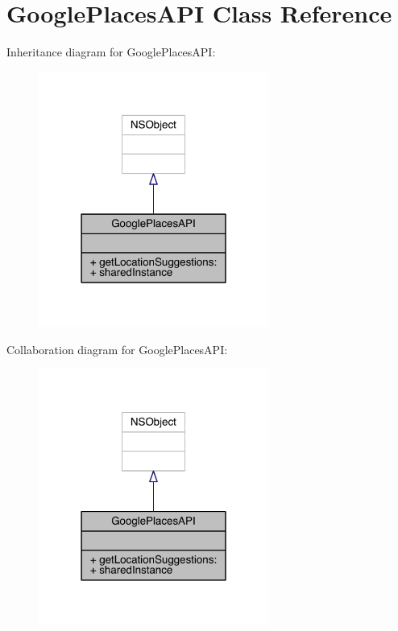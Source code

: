 \hypertarget{interface_google_places_a_p_i}{\section{Google\-Places\-A\-P\-I Class Reference}
\label{interface_google_places_a_p_i}
}


Inheritance diagram for Google\-Places\-A\-P\-I\-:\nopagebreak
\begin{figure}[H]
\begin{center}
\leavevmode
\includegraphics[width=214pt]{interface_google_places_a_p_i__inherit__graph}
\end{center}
\end{figure}


Collaboration diagram for Google\-Places\-A\-P\-I\-:\nopagebreak
\begin{figure}[H]
\begin{center}
\leavevmode
\includegraphics[width=214pt]{interface_google_places_a_p_i__coll__graph}
\end{center}
\end{figure}
